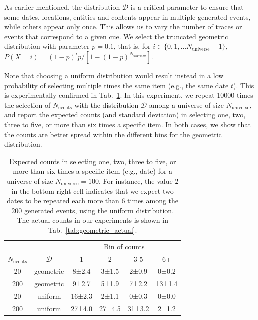 \documentclass{article}
\begin{document}
As earlier mentioned, the distribution $\mathcal{D}$ is a critical parameter to ensure that some dates, locations, entities and contents appear in multiple generated events, while others appear only once. This allows us to vary the number of traces or events that correspond to a given cue. 
We select the truncated geometric distribution with parameter $p=0.1$, that is, for $i \in \lbrace 0, 1, \ldots N_{\text{universe}} - 1 \rbrace$, $P(X=i) = (1-p)^{i}p / \left[ 1-(1-p)^{N_{\text{universe}}} \right].$

Note that choosing a uniform distribution would result instead in a low probability of selecting multiple times the same item (e.g., the same date $t$). This is experimentally confirmed in Tab.~\ref{tab:uniform_vs_geometric}. In this experiment, we repeat 10000 times the selection of $N_{\text{events}}$ with the distribution $\mathcal{D}$ among a universe of size $N_{\text{universe}}$, and report the expected counts (and standard deviation) in selecting one, two, three to five, or more than six times a specific item. In both cases, we show that the counts are better spread within the different bins for the geometric distribution. 

\begin{table}[ht]
\caption{Expected counts in selecting one, two, three to five, or more than six times a specific item (e.g., date) for a universe of size $N_{\text{universe}}=100$. For instance, the value $2$ in the bottom-right cell indicates that we expect two dates to be repeated each more than $6$ times among the $200$ generated events, using the uniform distribution. The actual counts in our experiments is shown in Tab.~\ref{tab:geometric_actual}.}
\label{tab:uniform_vs_geometric}
\centering
\begin{tabular}{cccccc}
  \hline
  &  & \multicolumn{4}{c}{Bin of counts} \\ 
 $N_{\text{events}}$  & $\mathcal{D}$  & 1 & 2 & 3-5 & 6+ \\ 
  \hline
20 & geometric   & 8±2.4 & 3±1.5 & 2±0.9 & 0±0.2 \\ 
 200 & geometric & 9±2.7 & 5±1.9 & 7±2.2 & 13±1.4 \\ 
  20 & uniform   & 16±2.3 & 2±1.1 & 0±0.3 & 0±0.0 \\ 
 200 & uniform   & 27±4.0 & 27±4.5 & 31±3.2 & 2±1.2 \\ 
   \hline
\end{tabular}
\end{table}
\end{document}
